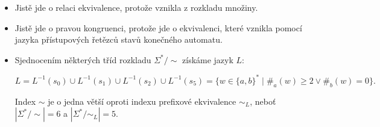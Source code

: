 \documentclass[a4paper, 12pt]{article}
\theoremstyle{definition}
\theoremstyle{definition}
\theoremstyle{definition}
\theoremstyle{remark}
\begin{document}
\begin{itemize}
    \item Jistě jde o relaci ekvivalence, protože vznikla z rozkladu množiny.
    \item Jistě jde o pravou kongruenci, protože jde o ekvivalenci, které vznikla pomocí jazyka přístupových řetězců stavů konečného automatu.
    \item Sjednocením některých tříd rozkladu $\Sigma^\ast / \sim$ získáme jazyk $L$:

    $$L = L^{-1}(s_0) \cup L^{-1}(s_1) \cup L^{-1}(s_2) \cup L^{-1}(s_5) = \{w \in \{a, b\}^\ast \; | \; \#_a(w) \geq 2 \lor \#_b(w) = 0\}.$$

    Index $\sim$ je o jedna větší oproti indexu prefixové ekvivalence $\sim_L$, neboť $|\Sigma^\ast / \sim| = 6$ a $|\Sigma^\ast / \sim_L| = 5$.
\end{itemize}

\newpage


\renewcommand{\refname}{Použitá literatura}

\end{document}
